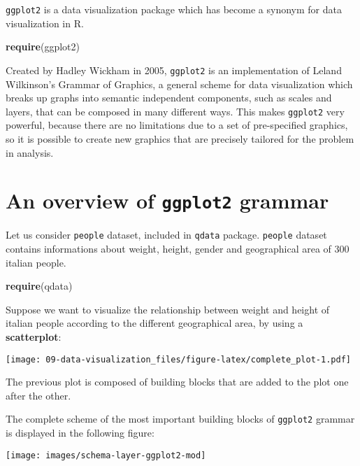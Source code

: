 \documentclass[]{book}
\newenvironment{Shaded}{\begin{snugshade}}{\end{snugshade}}
\newcommand{\KeywordTok}[1]{\textcolor[rgb]{0.13,0.29,0.53}{\textbf{{#1}}}}
\newcommand{\NormalTok}[1]{{#1}}
\begin{document}
\texttt{ggplot2} is a data visualization package which has become a
synonym for data visualization in R.

\begin{Shaded}
\begin{Highlighting}[]
\KeywordTok{require}\NormalTok{(ggplot2)}
\end{Highlighting}
\end{Shaded}

Created by Hadley Wickham in 2005, \texttt{ggplot2} is an implementation
of Leland Wilkinson's Grammar of Graphics, a general scheme for data
visualization which breaks up graphs into semantic independent
components, such as scales and layers, that can be composed in many
different ways. This makes \texttt{ggplot2} very powerful, because there
are no limitations due to a set of pre-specified graphics, so it is
possible to create new graphics that are precisely tailored for the
problem in analysis.

\section{\texorpdfstring{An overview of \texttt{ggplot2}
grammar}{An overview of ggplot2 grammar}}\label{an-overview-of-ggplot2-grammar}

Let us consider \texttt{people} dataset, included in \texttt{qdata}
package. \texttt{people} dataset contains informations about weight,
height, gender and geographical area of 300 italian people.

\begin{Shaded}
\begin{Highlighting}[]
\KeywordTok{require}\NormalTok{(qdata)}
\end{Highlighting}
\end{Shaded}

Suppose we want to visualize the relationship between weight and height
of italian people according to the different geographical area, by using
a \textbf{scatterplot}:

\texttt{[image: 09-data-visualization\_files/figure-latex/complete\_plot-1.pdf]}

The previous plot is composed of building blocks that are added to the
plot one after the other.

The complete scheme of the most important building blocks of
\texttt{ggplot2} grammar is displayed in the following figure:

\texttt{[image: images/schema-layer-ggplot2-mod]}
\end{document}
